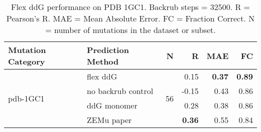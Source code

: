 \begin{table}
  \begin{tabular}{llrrrr}
\toprule
Mutation Category &   Prediction Method &   N &     R &  MAE &   FC \\
\midrule
 \multirow{ 4}{*}{pdb-1GC1} & flex ddG & \multirow{ 4}{*}{56} & 0.15 & \textbf{0.37} & \textbf{0.89}  \\
 & no backrub control & & -0.15 & 0.43 & 0.86  \\
 & ddG monomer & & 0.28 & 0.38 & 0.86  \\
 & ZEMu paper & & \textbf{0.36} & 0.55 & 0.84  \\
\bottomrule
\end{tabular}
  \caption[Flex ddG performance on PDB 1GC1]{
    Flex ddG performance on PDB 1GC1. Backrub steps = 32500. R = Pearson's R. MAE = Mean Absolute Error. FC = Fraction Correct. N = number of mutations in the dataset or subset.
  } \label{tab:table-pdb-1GC1}
\end{table}
